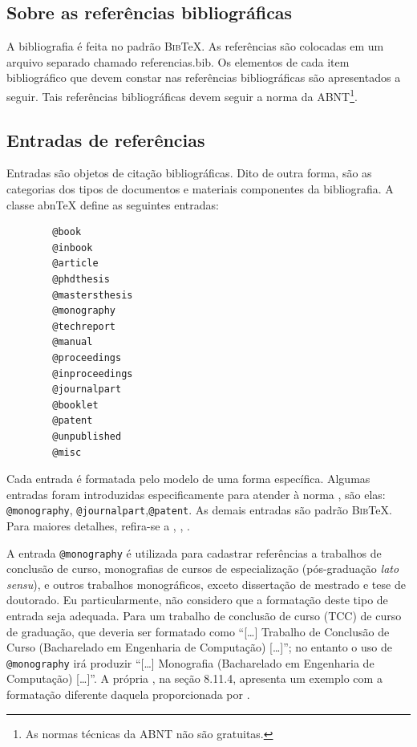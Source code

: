 \begin{apendicesenv}
    \chapter{Sobre as referências bibliográficas}
    \label{chap_sobre_as_referencias_bibliograficas}

    A bibliografia é feita no padrão \textsc{Bib}\TeX{}.
    As referências são colocadas em um arquivo separado chamado {\color{red} referencias.bib}.
    Os elementos de cada item bibliográfico que devem constar nas referências bibliográficas são apresentados a seguir.
    Tais referências bibliográficas devem seguir a norma  da ABNT\footnote{As normas técnicas da ABNT não são gratuitas.}.

    \section{Entradas de referências}
    \label{sec_entradas_de_referencias}

    Entradas são objetos de citação bibliográficas.
    Dito de outra forma, são as categorias dos tipos de documentos e materiais componentes da bibliografia.
    A classe abn\TeX{} define as seguintes entradas:

    \begin{verbatim}
        @book
        @inbook
        @article
        @phdthesis
        @mastersthesis
        @monography
        @techreport
        @manual
        @proceedings
        @inproceedings
        @journalpart
        @booklet
        @patent
        @unpublished
        @misc
    \end{verbatim}

    Cada entrada é formatada pelo modelo de uma forma específica.
    Algumas entradas foram introduzidas especificamente para atender à norma , são elas: \verb|@monography|, \verb|@journalpart|,\verb|@patent|.
    As demais entradas são padrão \textsc{Bib}\TeX{}.
    Para maiores detalhes, refira-se a , , .

    A entrada \verb|@monography| é utilizada para cadastrar referências a trabalhos de conclusão de curso, monografias de cursos de especialização (pós-graduação \textit{lato sensu}), e outros trabalhos monográficos, exceto dissertação de mestrado e tese de doutorado.
    Eu particularmente, não considero que a formatação deste tipo de entrada seja adequada.
    Para um trabalho de conclusão de curso (TCC) de curso de graduação, que deveria ser formatado como ``[\ldots] Trabalho de Conclusão de Curso (Bacharelado em Engenharia de Computação) [\ldots]''; no entanto o uso de \verb|@monography| irá produzir ``[\ldots] Monografia (Bacharelado em Engenharia de Computação) [\ldots]''.
    A própria  , na seção 8.11.4, apresenta um exemplo com a formatação diferente daquela proporcionada por .


\end{apendicesenv}

